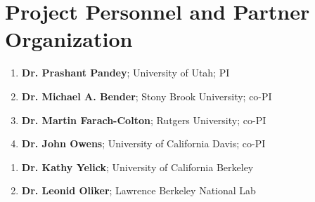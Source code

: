 
\section*{Project Personnel and Partner Organization}
\vspace{0.1in}
\noindent
\begin{enumerate}
\item \textbf{Dr. Prashant Pandey}; University of Utah; PI
\item \textbf{Dr. Michael A. Bender}; Stony Brook University; co-PI
\item \textbf{Dr. Martin Farach-Colton}; Rutgers University; co-PI
\item \textbf{Dr. John Owens}; University of California Davis; co-PI
\end{enumerate}
\vspace{3mm}
\begin{enumerate}
\item \textbf{Dr. Kathy Yelick}; University of California Berkeley
\item \textbf{Dr. Leonid Oliker}; Lawrence Berkeley National Lab
\end{enumerate}
